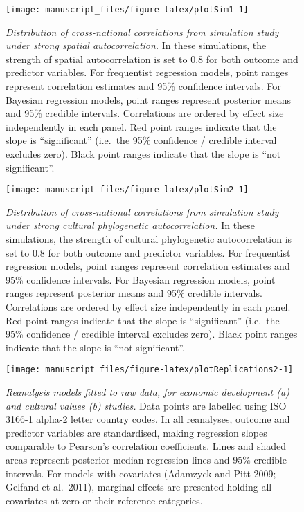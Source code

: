 \documentclass[
  man,floatsintext]{apa6}
\begin{document}
\newpage



\begin{figure}[H]
\texttt{[image: manuscript\_files/figure-latex/plotSim1-1]} \caption{\emph{Distribution of cross-national correlations from simulation study under strong spatial autocorrelation.} In these simulations, the strength of spatial autocorrelation is set to 0.8 for both outcome and predictor variables. For frequentist regression models, point ranges represent correlation estimates and 95\% confidence intervals. For Bayesian regression models, point ranges represent posterior means and 95\% credible intervals. Correlations are ordered by effect size independently in each panel. Red point ranges indicate that the slope is ``significant'' (i.e.~the 95\% confidence / credible interval excludes zero). Black point ranges indicate that the slope is ``not significant''.}\label{fig:plotSim1}
\end{figure}

\newpage



\begin{figure}[H]
\texttt{[image: manuscript\_files/figure-latex/plotSim2-1]} \caption{\emph{Distribution of cross-national correlations from simulation study under strong cultural phylogenetic autocorrelation.} In these simulations, the strength of cultural phylogenetic autocorrelation is set to 0.8 for both outcome and predictor variables. For frequentist regression models, point ranges represent correlation estimates and 95\% confidence intervals. For Bayesian regression models, point ranges represent posterior means and 95\% credible intervals. Correlations are ordered by effect size independently in each panel. Red point ranges indicate that the slope is ``significant'' (i.e.~the 95\% confidence / credible interval excludes zero). Black point ranges indicate that the slope is ``not significant''.}\label{fig:plotSim2}
\end{figure}

\newpage



\begin{figure}[H]
\texttt{[image: manuscript\_files/figure-latex/plotReplications2-1]} \caption{\emph{Reanalysis models fitted to raw data, for economic development (a) and cultural values (b) studies.} Data points are labelled using ISO 3166-1 alpha-2 letter country codes. In all reanalyses, outcome and predictor variables are standardised, making regression slopes comparable to Pearson's correlation coefficients. Lines and shaded areas represent posterior median regression lines and 95\% credible intervals. For models with covariates (Adamzyck and Pitt 2009; Gelfand et al.~2011), marginal effects are presented holding all covariates at zero or their reference categories.}\label{fig:plotReplications2}
\end{figure}
\end{document}
